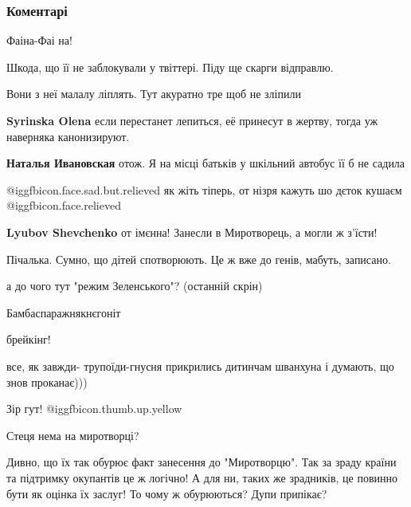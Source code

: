  
 
 
 
 
\subsubsection{Коментарі}

\begin{itemize} %
Фаіна-Фаі на!

Шкода, що її не заблокували у твіттері. Піду ще скарги відправлю.

Вони з неї малалу ліплять. Тут акуратно тре щоб не зліпили

\begin{itemize} %
\textbf{Syrinska Olena} если перестанет лепиться, её принесут в жертву, тогда уж наверняка канонизируют.

\textbf{Наталья Ивановская} отож. Я на місці батьків у шкільний автобус її б не садила
\end{itemize} %

 @igg{fbicon.face.sad.but.relieved} як жіть тіперь, от нізря кажуть шо дєток кушаєм  @igg{fbicon.face.relieved} 

\begin{itemize} %
\textbf{Lyubov Shevchenko} от імєнна! Занесли в Миротворець, а могли ж з'їсти!
\end{itemize} %

Пічалька. Сумно, що дітей спотворюють. Це ж вже до генів, мабуть, записано.

а до чого тут "режим Зеленського"? (останній скрін)

Бамбаспаражнякнєгоніт

брейкінг!

все, як завжди- трупоїди-гнусня прикрились дитинчам шванхуна і думають, що знов проканає)))

Зір гут!  @igg{fbicon.thumb.up.yellow} 


Стеця нема на миротворці?


Дивно, що їх так обурює факт занесення до "Миротворцю". Так за зраду країни та
підтримку окупантів це ж логічно! А для ни, таких же зрадників, це повинно бути
як оцінка їх заслуг! То чому ж обурюються? Дупи припікає?


\end{itemize} %
